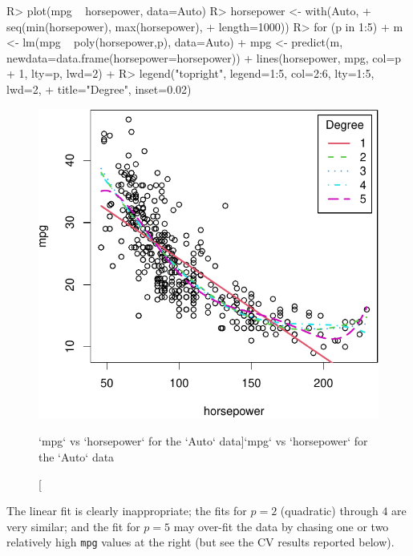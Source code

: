\documentclass[
]{jss}
\begin{document}
\begin{CodeChunk}
\begin{CodeInput}
R> plot(mpg ~ horsepower, data=Auto)
R> horsepower <- with(Auto, 
+                    seq(min(horsepower), max(horsepower), 
+                        length=1000))
R> for (p in 1:5){
+   m <- lm(mpg ~ poly(horsepower,p), data=Auto)
+   mpg <- predict(m, newdata=data.frame(horsepower=horsepower))
+   lines(horsepower, mpg, col=p + 1, lty=p, lwd=2)
+ }
R> legend("topright", legend=1:5, col=2:6, lty=1:5, lwd=2,
+        title="Degree", inset=0.02)
\end{CodeInput}
\begin{figure}

{\centering \includegraphics[width=1\linewidth]{JSS-article-reduced_files/figure-latex/mpg-horsepower-scatterplot-polynomials-1} 

}

\caption[`mpg` vs `horsepower` for the `Auto` data]{`mpg` vs `horsepower` for the `Auto` data}\label{fig:mpg-horsepower-scatterplot-polynomials}
\end{figure}
\end{CodeChunk}

The linear fit is clearly inappropriate; the fits for \(p = 2\)
(quadratic) through \(4\) are very similar; and the fit for \(p = 5\)
may over-fit the data by chasing one or two relatively high \texttt{mpg}
values at the right (but see the CV results reported below).
\end{document}
